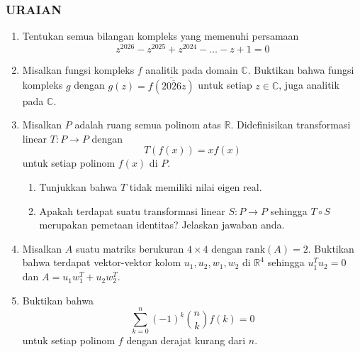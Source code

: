 \documentclass[12pt,twoside]{article}
\begin{document}
\subsubsection*{URAIAN}
\begin{enumerate}
	\item Tentukan semua bilangan kompleks yang memenuhi persamaan
	      \[z^{2026} - z^{2025} + z^{2024} - \dots - z + 1 = 0\]

	\item Misalkan fungsi kompleks $f$ analitik pada domain $\mathbb{C}$. Buktikan bahwa fungsi kompleks $g$ dengan
	      $g(z) = \overline{f(\overline{2026z})}$ untuk setiap $z \in \mathbb{C}$,
	      juga analitik pada $\mathbb{C}$.

	\item Misalkan $P$ adalah ruang semua polinom atas $\mathbb{R}$. Didefinisikan transformasi linear $T : P \to P$ dengan
	      \[T(f(x)) = xf(x)\]
	      untuk setiap polinom $f(x)$ di $P$.
	      \begin{enumerate}
		      \item[(a)] Tunjukkan bahwa $T$ tidak memiliki nilai eigen real.
		      \item[(b)] Apakah terdapat suatu transformasi linear $S : P \to P$ sehingga $T \circ S$ merupakan pemetaan identitas? Jelaskan jawaban anda.
	      \end{enumerate}

	\item Misalkan $A$ suatu matriks berukuran $4 \times 4$ dengan $\text{rank}(A) = 2$. Buktikan bahwa terdapat vektor-vektor kolom $u_1, u_2, w_1, w_2$ di $\mathbb{R}^4$ sehingga $u_1^T u_2 = 0$ dan $A = u_1 w_1^T + u_2 w_2^T$.

	\item Buktikan bahwa
	      \[\sum_{k=0}^{n} (-1)^k \binom{n}{k} f(k) = 0\]
	      untuk setiap polinom $f$ dengan derajat kurang dari $n$.
\end{enumerate}
\end{document}
